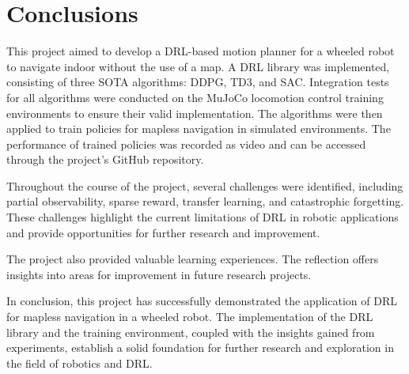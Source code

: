 \section{Conclusions} \label{sec:conclusion}

This project aimed to develop a DRL-based motion planner for a wheeled robot to navigate indoor without the use of a map. A DRL library was implemented, consisting of three SOTA algorithms: DDPG, TD3, and SAC. Integration tests for all algorithms were conducted on the MuJoCo locomotion control training environments to ensure their valid implementation. The algorithms were then applied to train policies for mapless navigation in simulated environments. The performance of trained policies was recorded as video and can be accessed through the project's GitHub repository.

Throughout the course of the project, several challenges were identified, including partial observability, sparse reward, transfer learning, and catastrophic forgetting. These challenges highlight the current limitations of DRL in robotic applications and provide opportunities for further research and improvement.

The project also provided valuable learning experiences. The reflection offers insights into areas for improvement in future research projects.

In conclusion, this project has successfully demonstrated the application of DRL for mapless navigation in a wheeled robot. The implementation of the DRL library and the training environment, coupled with the insights gained from experiments, establish a solid foundation for further research and exploration in the field of robotics and DRL.
